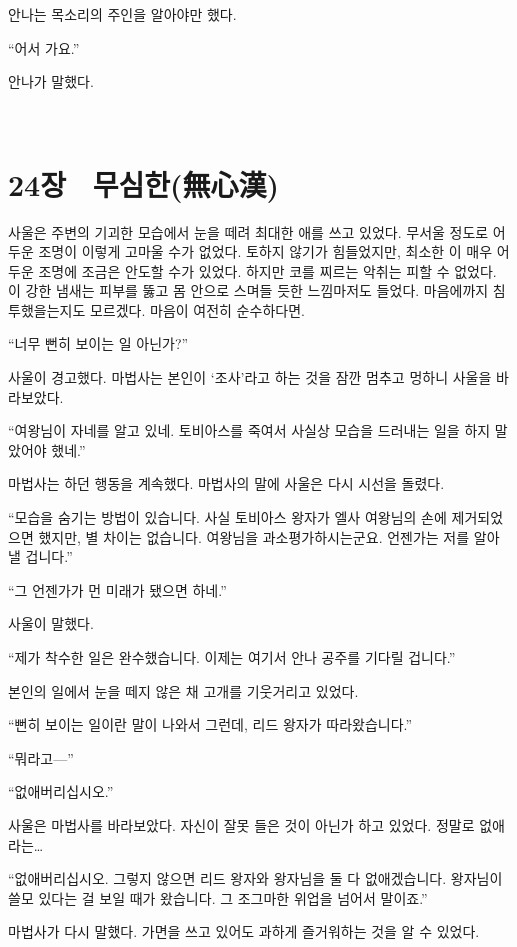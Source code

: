 안나는 목소리의 주인을 알아야만 했다.

``어서 가요.''

안나가 말했다.

﻿

\chapter[24장  무심한(無心漢)][24장\hspace*{.5em}무심한(無心漢)]{24장 \ 무심한(無心漢)}



사울은 주변의 기괴한 모습에서 눈을 떼려 최대한 애를 쓰고 있었다. 무서울 정도로 어두운 조명이 이렇게 고마울 수가 없었다. 토하지 않기가 힘들었지만, 최소한 이 매우 어두운 조명에 조금은 안도할 수가 있었다. 하지만 코를 찌르는 악취는 피할 수 없었다. 이 강한 냄새는 피부를 뚫고 몸 안으로 스며들 듯한 느낌마저도 들었다. 마음에까지 침투했을는지도 모르겠다. 마음이 여전히 순수하다면.

``너무 뻔히 보이는 일 아닌가?''

사울이 경고했다. 마법사는 본인이 `조사'라고 하는 것을 잠깐 멈추고 멍하니 사울을 바라보았다.

``여왕님이 자네를 알고 있네. 토비아스를 죽여서 사실상 모습을 드러내는 일을 하지 말았어야 했네.''

마법사는 하던 행동을 계속했다. 마법사의 말에 사울은 다시 시선을 돌렸다.

``모습을 숨기는 방법이 있습니다. 사실 토비아스 왕자가 엘사 여왕님의 손에 제거되었으면 했지만, 별 차이는 없습니다. 여왕님을 과소평가하시는군요. 언젠가는 저를 알아낼 겁니다.''

``그 언젠가가 먼 미래가 됐으면 하네.''

사울이 말했다.

``제가 착수한 일은 완수했습니다. 이제는 여기서 안나 공주를 기다릴 겁니다.''

본인의 일에서 눈을 떼지 않은 채 고개를 기웃거리고 있었다.

``뻔히 보이는 일이란 말이 나와서 그런데, 리드 왕자가 따라왔습니다.''

``뭐라고—''

``없애버리십시오.''

사울은 마법사를 바라보았다. 자신이 잘못 들은 것이 아닌가 하고 있었다. 정말로 없애라는\ldots

``없애버리십시오. 그렇지 않으면 리드 왕자와 왕자님을 둘 다 없애겠습니다. 왕자님이 쓸모 있다는 걸 보일 때가 왔습니다. 그 조그마한 위업을 넘어서 말이죠.''

마법사가 다시 말했다. 가면을 쓰고 있어도 과하게 즐거워하는 것을 알 수 있었다.

